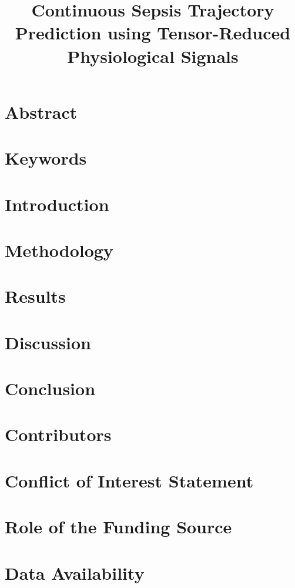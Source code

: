 \documentclass[a4paper,12pt]{article}
\title{Continuous Sepsis Trajectory Prediction using Tensor-Reduced Physiological Signals}
\date{}
\begin{document}
    \maketitle
    
    \clearpage
    
    \section*{Abstract} \label{sec:abstract}
    
    
    \section*{Keywords} \label{sec:keywords}
    
    
    \section{Introduction} \label{sec:intro}
    
    
    \section{Methodology} \label{sec:methods}
    
    
    \section{Results} \label{sec:results}
    
    
    \section{Discussion} \label{sec:discussion}
    
    
    \section{Conclusion} \label{sec:conclusion}
    
    
    \section{Contributors}
    
    
    \section{Conflict of Interest Statement}
    
    
    \section{Role of the Funding Source}
    

    \section{Data Availability}
    
    
    \printbibliography 
\end{document}

